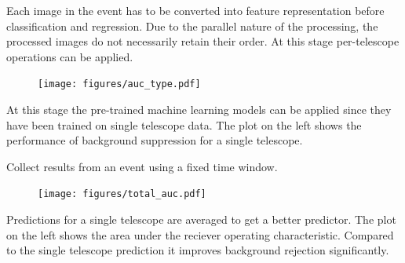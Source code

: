 \begin{multicols}{2}
\begin{center}
\begin{streamblock}[equal height group=C, width=0.8\linewidth]{0mm}{-5mm}{}
\begin{multicols}{2}
            \columnbreak
            Each image in the event has to be converted into feature representation before classification and regression.
            Due to the parallel nature of the processing, the processed images do not necessarily retain their order.
            At this stage per-telescope operations can be applied.

          \end{multicols}
        \end{streamblock}%

        \begin{streamblock}[equal height group=C, width=0.8\linewidth]{-5mm}{-5mm}{}%
          \begin{multicols}{2}
            \begin{figure}
              \texttt{[image: figures/auc\_type.pdf]}
            \end{figure}
            \columnbreak

            At this stage the pre-trained machine learning models can be applied since they
            have been trained on single telescope data. The plot on the left shows the performance
            of background suppression for a single telescope.

          \end{multicols}
        \end{streamblock}%


        \begin{streamblock}[height=2.1cm, colframe=white!60!black,, width=0.8\linewidth]{-5mm}{0}{}%
          \begin{center}
            Collect results from an event using a fixed time window.
          \end{center}
        \end{streamblock}%

        \begin{streamblock}[equal height group=C, width=0.8\linewidth]{0mm}{-5mm}{}%
          \begin{multicols}{2}
            \begin{figure}
              \texttt{[image: figures/total\_auc.pdf]}
            \end{figure}
            \columnbreak
            Predictions for a single telescope are averaged to get a better predictor.
            The plot on the left shows the area under the reciever operating characteristic.
            Compared to the single telescope prediction it improves background rejection significantly.
          \end{multicols}
        \end{streamblock}%


\end{center}
\end{multicols}

